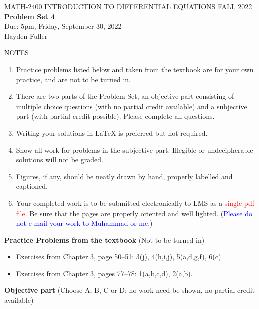 \documentclass{article}
\begin{document}
\begin{center}
\large{ MATH-2400 \hspace{.27in}  INTRODUCTION TO DIFFERENTIAL EQUATIONS \hspace{.27in}FALL 2022\bigskip\\ {\bf Problem Set 4} \smallskip\\ Due: 5pm, Friday, September 30, 2022}
\\Hayden Fuller
\end{center}

\bigskip\noindent
\underline{NOTES}
\begin{enumerate}
\item Practice problems listed below and taken from the textbook are for your own practice, and are not to be turned in.
\item There are two parts of the Problem Set, an objective part consisting of multiple choice questions (with no partial credit available) and a subjective part (with partial credit possible).  Please complete all questions.
\item Writing your solutions in {\LaTeX} is preferred but not required.
\item Show all work for problems in the subjective part.  Illegible or undecipherable solutions will not be graded. 
\item Figures, if any, should be neatly drawn by hand, properly labelled and captioned.  
\item Your completed work is to be submitted electronically to LMS  as a \textcolor{red}{single pdf file}. Be sure that the pages are properly oriented and well lighted.  (\textcolor{blue}{Please do not e-mail your work to Muhammad or me.})
\end{enumerate}

\bigskip\noindent
{\bf Practice Problems from the textbook} (Not to be turned in)
\begin{itemize}
\item
Exercises from Chapter 3, page 50--51: 3(j), 4(h,i,j), 5(a,d,g,f), 6(c).
\item
Exercises from Chapter 3, pages 77--78: 1(a,b,c,d), 2(a,b).
\end{itemize}

\bigskip\noindent
{\bf Objective part} (Choose A, B, C or D; no work need be shown, no partial credit available)
\end{document}
